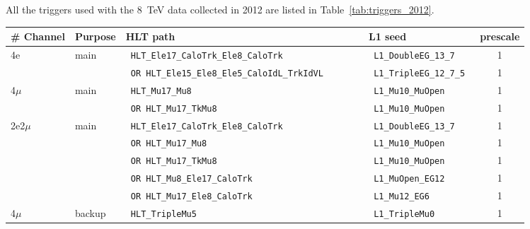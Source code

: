 All the triggers used with the 8~TeV data collected in 2012 are listed in Table~\ref{tab:triggers_2012}.
\begin{table}[h]
\scriptsize
    \centering
    \begin{tabular}{|l|l||l|l|c|}
\hline %
\# Channel     & Purpose & HLT path                                                                                & L1 seed            & prescale  \\ \hline
\hline %
        4e     & main    & \verb| HLT_Ele17_CaloTrk_Ele8_CaloTrk |                                 & \verb| L1_DoubleEG_13_7 |   & 1      \\
                     &            & \verb| OR HLT_Ele15_Ele8_Ele5_CaloIdL_TrkIdVL       |                      & \verb| L1_TripleEG_12_7_5 | & 1          \\
        4$\mu$ & main    & \verb| HLT_Mu17_Mu8  |                                                  & \verb| L1_Mu10_MuOpen   |   & 1       \\
               &         & \verb| OR HLT_Mu17_TkMu8   |                                            & \verb| L1_Mu10_MuOpen   |   & 1       \\
      2e2$\mu$ & main    & \verb| HLT_Ele17_CaloTrk_Ele8_CaloTrk   |                               & \verb| L1_DoubleEG_13_7 |   & 1      \\
               &         & \verb| OR HLT_Mu17_Mu8       |                                          & \verb| L1_Mu10_MuOpen   |   & 1      \\
               &         & \verb| OR HLT_Mu17_TkMu8  |                                             & \verb| L1_Mu10_MuOpen   |   & 1      \\
               &         & \verb| OR HLT_Mu8_Ele17_CaloTrk      |                                  & \verb| L1_MuOpen_EG12   |   & 1      \\
               &         & \verb| OR HLT_Mu17_Ele8_CaloTrk      |                                  & \verb| L1_Mu12_EG6      |   & 1      \\
\hline %
        4$\mu$ & backup  & \verb| HLT_TripleMu5    |                                               & \verb| L1_TripleMu0 |       & 1      \\

\end{tabular}
\end{table}
